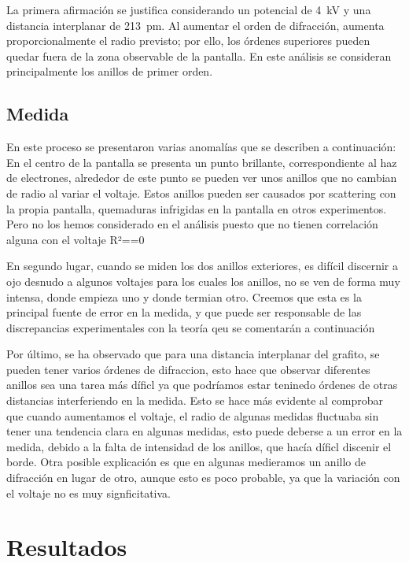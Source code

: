 \documentclass[a4paper,11pt]{article}
\begin{document}
La primera afirmación se justifica considerando un potencial de
\SI{4}{kV} y una distancia interplanar de \SI{213}{pm}. Al aumentar el orden
de difracción, aumenta proporcionalmente el radio previsto; por ello, los
órdenes superiores pueden quedar fuera de la zona observable de la pantalla.
En este análisis se consideran principalmente los anillos de primer orden.

\subsection{Medida}
En este proceso se presentaron varias anomalías que se describen a continuación:
En el centro de la pantalla se presenta un punto brillante, correspondiente al haz de electrones, alrededor de este punto
se pueden ver unos anillos que no cambian de radio al variar el voltaje.
Estos anillos pueden ser causados por scattering con la propia pantalla, quemaduras infrigidas en la pantalla en otros experimentos.
Pero no los hemos considerado en el análisis puesto que no tienen correlación alguna con el voltaje R²==0

En segundo lugar, cuando se miden los dos anillos exteriores, es difícil discernir a ojo desnudo a algunos voltajes para los cuales los anillos,
no se ven de forma muy intensa, donde empieza uno y donde termian otro.
Creemos que esta es la principal fuente de error en la medida, y que puede ser responsable de las discrepancias experimentales con la teoría qeu se comentarán a continuación

Por último, se ha observado que para una distancia interplanar del grafito, se pueden tener varios órdenes de difraccion,
esto hace que observar diferentes anillos sea una tarea más díficl ya que podríamos estar teninedo órdenes de otras distancias interferiendo en la medida.
Esto se hace más evidente al comprobar que cuando aumentamos el voltaje, el radio de algunas medidas fluctuaba sin tener una tendencia clara en algunas medidas,
esto puede deberse a un error en la medida, debido a la falta de intensidad de los anillos, que hacía díficl discenir el borde.
Otra posible explicación es que en algunas medieramos un anillo de difracción en lugar de otro, aunque esto es poco probable, ya que la variación con el voltaje no es 
muy signficitativa.

\section{Resultados}
\end{document}
